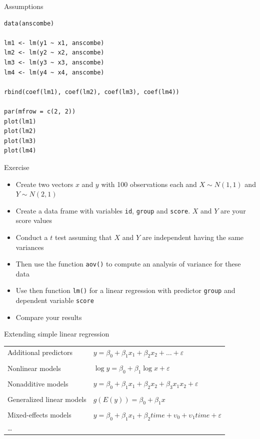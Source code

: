 \documentclass[aspectratio=169]{beamer}
\begin{document}
\begin{frame}[fragile]{Assumptions}
\begin{lstlisting}
data(anscombe)

lm1 <- lm(y1 ~ x1, anscombe)
lm2 <- lm(y2 ~ x2, anscombe)
lm3 <- lm(y3 ~ x3, anscombe)
lm4 <- lm(y4 ~ x4, anscombe)

rbind(coef(lm1), coef(lm2), coef(lm3), coef(lm4))

par(mfrow = c(2, 2))
plot(lm1)
plot(lm2)
plot(lm3)
plot(lm4)
\end{lstlisting}
\end{frame}

\begin{frame}{}
  \begin{block}{Exercise}
    \begin{itemize}
      \item Create two vectors $x$ and $y$ with 100 observations each and
        $X \sim N(1,1)$ and $Y \sim N(2,1)$
      \item Create a data frame with variables \texttt{id}, \texttt{group}
        and \texttt{score}. $X$ and $Y$ are your score values
      \item Conduct a $t$ test assuming that $X$ and $Y$ are independent
        having the same variances
      \item Then use the function \texttt{aov()} to compute an analysis of
        variance for these data
      \item Use then function \texttt{lm()} for a linear regression with
        predictor \texttt{group} and dependent variable \texttt{score}
      \item Compare your results
    \end{itemize}
  \end{block}
\end{frame}

\begin{frame}{Extending simple linear regression}
  \begin{tabular}{ll}
    Additional predictors &
      $y = \beta_0 + \beta_1 x_1 + \beta_2 x_2 + \dots +
      \varepsilon$\\
      & \\
    Nonlinear models &
      $\log y = \beta_0 + \beta_1 \log x + \varepsilon$\\
      & \\
    Nonadditive models &
      $y = \beta_0 + \beta_1 x_1 + \beta_2 x_2 + \beta_3
      x_1 x_2 + \varepsilon$\\
      & \\
    Generalized linear models &
      $g(E(y)) = \beta_0 + \beta_1 x$\\
      & \\
    Mixed-effects models &
      $y = \beta_0 + \beta_1 x_1 + \beta_2 time + 
      \upsilon_0 + \upsilon_1 time + \varepsilon$\\
      \dots & \\
  \end{tabular}
\end{frame}
\end{document}
